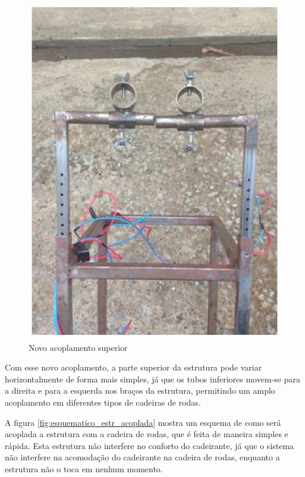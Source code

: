 \begin{figure}[!htb]
\centering
\includegraphics[keepaspectratio=true,scale=0.7]{figuras/resultados/novo_acoplamento_superior}
\caption{Novo acoplamento superior}
\label{fig:novo_acoplamento_superior}
\end{figure}

Com esse novo acoplamento, a parte superior da estrutura pode variar horizontalmente de forma mais simples, já que os tubos inferiores movem-se para a direita e para a esquerda nos braços da estrutura, permitindo um amplo acoplamento em diferentes tipos de cadeiras de rodas.

A figura \ref{fig:esquematico_estr_acoplada} mostra um esquema de como será acoplada a estrutura com a cadeira de rodas, que é feita de maneira simples e rápida. Esta estrutura não interfere no conforto do cadeirante, já que o sistema não interfere na acomodação do cadeirante na cadeira de rodas, enquanto a estrutura não o toca em nenhum momento.

